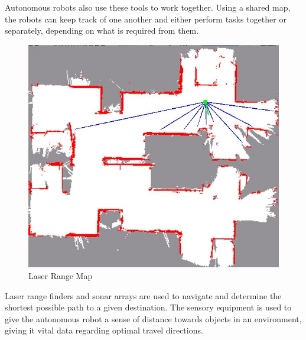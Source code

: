 Autonomous robots also use these tools to work together. Using a shared map, the robots can keep track of one another and either perform tasks together or separately, depending on what is required from them.

\begin{figure}[H]
	\centering
	\includegraphics[scale=.7]{images/laserrangemap.jpg}
	\caption{Laser Range Map\cite{laserrangepic}}
	\label{fig:laserrangemap}
\end{figure}

Laser range finders and sonar arrays are used to navigate and determine the shortest possible path to a given destination. The sensory equipment is used to give the autonomous robot a sense of distance towards objects in an environment, giving it vital data regarding optimal travel directions\cite{lasersonar}.






